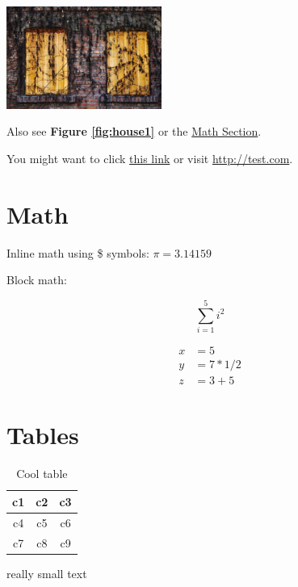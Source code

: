 \documentclass[10pt, letterpaper]{article}  %
\begin{document}
\includegraphics[width=2in]{images/image.jpg}

Also see \textbf{Figure \ref{fig:house1}} or the
\hyperref[sec:math]{Math Section}.

You might want to click \href{http://test.com}{this link} or visit \url{http://test.com}.



\section{Math}
\label{sec:math}

Inline math using \$ symbols: $\pi = 3.14159$

Block math:

\[
    \sum^{5}_{i=1} i^2
\]

\begin{align*}
    x &= 5 \\
    y &= 7 * 1 / 2 \\
    z &= 3 + 5
\end{align*}


\vspace{3in}
\section{Tables}

\begin{table}[h!]
\centering
\begin{tabular}{|c|c|c|}
    \hline
    c1 & c2 & c3 \\
    \hline
    c4 & c5 & c6 \\
    c7 & c8 & c9 \\
    \hline
\end{tabular}

\vspace{-0.3cm}
\caption{Cool table}
\end{table}

\begin{small}
    really small text
\end{small}
\end{document}
